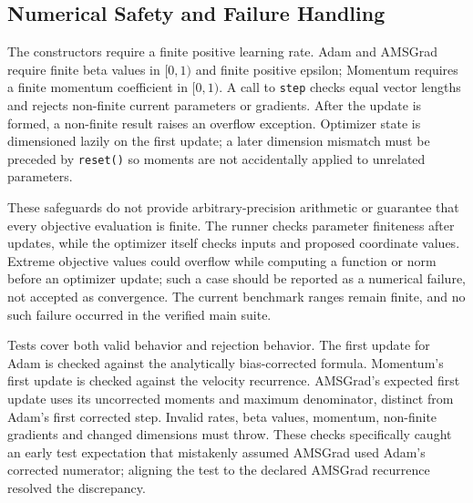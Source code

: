 ﻿\documentclass[conference]{IEEEtran}
\begin{document}
\subsection{Numerical Safety and Failure Handling}
The constructors require a finite positive learning rate. Adam and AMSGrad require finite beta values in $[0,1)$ and finite positive epsilon; Momentum requires a finite momentum coefficient in $[0,1)$. A call to \texttt{step} checks equal vector lengths and rejects non-finite current parameters or gradients. After the update is formed, a non-finite result raises an overflow exception. Optimizer state is dimensioned lazily on the first update; a later dimension mismatch must be preceded by \texttt{reset()} so moments are not accidentally applied to unrelated parameters.

These safeguards do not provide arbitrary-precision arithmetic or guarantee that every objective evaluation is finite. The runner checks parameter finiteness after updates, while the optimizer itself checks inputs and proposed coordinate values. Extreme objective values could overflow while computing a function or norm before an optimizer update; such a case should be reported as a numerical failure, not accepted as convergence. The current benchmark ranges remain finite, and no such failure occurred in the verified main suite.

Tests cover both valid behavior and rejection behavior. The first update for Adam is checked against the analytically bias-corrected formula. Momentum's first update is checked against the velocity recurrence. AMSGrad's expected first update uses its uncorrected moments and maximum denominator, distinct from Adam's first corrected step. Invalid rates, beta values, momentum, non-finite gradients and changed dimensions must throw. These checks specifically caught an early test expectation that mistakenly assumed AMSGrad used Adam's corrected numerator; aligning the test to the declared AMSGrad recurrence resolved the discrepancy.
\end{document}
